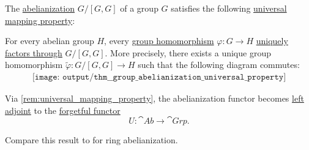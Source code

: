\begin{theorem}\label{thm:group_abelianization_universal_property}
  The \hyperref[def:group_abelianization]{abelianization} \( G / [G, G] \) of a group \( G \) satisfies the following \hyperref[rem:universal_mapping_property]{universal mapping property}:
  \begin{displayquote}
    For every abelian group \( H \), every \hyperref[def:group/homomorphism]{group homomorphism} \( \varphi: G \to H \) \hyperref[def:factors_through]{uniquely factors through} \( G / [G, G] \). More precisely, there exists a unique group homomorphism \( \widetilde{\varphi}: G / [G, G] \to H \) such that the following diagram commutes:
    \begin{equation}\label{eq:thm:group_abelianization_universal_property/diagram}
      \begin{aligned}
        \texttt{[image: output/thm\_\_group\_abelianization\_universal\_property]}
      \end{aligned}
    \end{equation}
  \end{displayquote}
\end{theorem}
\begin{comments}
  \item Via \cref{rem:universal_mapping_property}, the abelianization functor becomes \hyperref[def:category_adjunction]{left adjoint} to the \hyperref[def:concrete_category]{forgetful functor}
  \begin{equation*}
    U: \cat{Ab} \to \cat{Grp}.
  \end{equation*}

  \item Compare this result to  for ring abelianization.
\end{comments}
